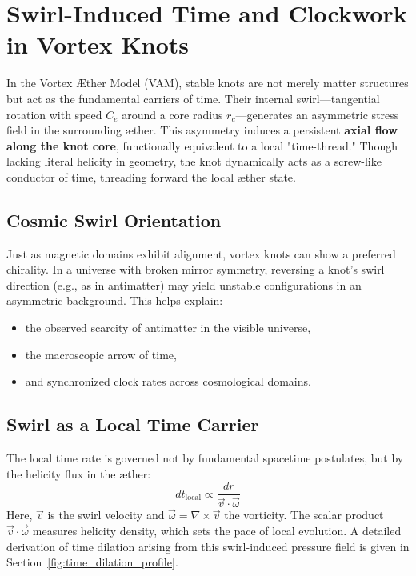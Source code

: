 \section{Swirl-Induced Time and Clockwork in Vortex Knots}

In the Vortex Æther Model (VAM), stable knots are not merely matter structures but act as the fundamental carriers of time. Their internal swirl—tangential rotation with speed \( C_e \) around a core radius \( r_c \)—generates an asymmetric stress field in the surrounding æther. This asymmetry induces a persistent \textbf{axial flow along the knot core}, functionally equivalent to a local "time-thread." Though lacking literal helicity in geometry, the knot dynamically acts as a screw-like conductor of time, threading forward the local æther state.

\subsection*{Cosmic Swirl Orientation}

Just as magnetic domains exhibit alignment, vortex knots can show a preferred chirality. In a universe with broken mirror symmetry, reversing a knot's swirl direction (e.g., as in antimatter) may yield unstable configurations in an asymmetric background. This helps explain:
\begin{itemize}
    \item the observed scarcity of antimatter in the visible universe,
    \item the macroscopic arrow of time,
    \item and synchronized clock rates across cosmological domains.
\end{itemize}

\subsection*{Swirl as a Local Time Carrier}

The local time rate is governed not by fundamental spacetime postulates, but by the helicity flux in the æther:
\[
    dt_{\text{local}} \propto \frac{dr}{\vec{v} \cdot \vec{\omega}}
\]
Here, \( \vec{v} \) is the swirl velocity and \( \vec{\omega} = \nabla \times \vec{v} \) the vorticity. The scalar product \( \vec{v} \cdot \vec{\omega} \) measures helicity density, which sets the pace of local evolution. A detailed derivation of time dilation arising from this swirl-induced pressure field is given in Section~\ref{fig:time_dilation_profile}.

